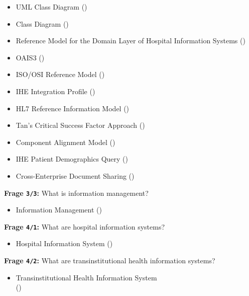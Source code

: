 \begin{itemize}
  \item UML Class Diagram ()
  \item Class Diagram ()
  \item Reference Model for the Domain Layer of Hospital Information Systems ()
  \item OAIS3 ()
  \item ISO/OSI Reference Model ()
  \item IHE Integration Profile ()
  \item HL7 Reference Information Model ()
  \item Tan’s Critical Success Factor Approach ()
  \item Component Alignment Model ()
  \item IHE Patient Demographics Query ()
  \item Cross-Enterprise Document Sharing ()
\end{itemize}

\textbf{Frage \texttt{3/3}:} What is information management?

\begin{itemize}
  \item Information Management ()
\end{itemize}

\textbf{Frage \texttt{4/1}:} What are hospital information systems?

\begin{itemize}
  \item Hospital Information System ()
\end{itemize}

\textbf{Frage \texttt{4/2}:} What are transinstitutional health information systems?

\begin{itemize}
  \item Transinstitutional Health Information System \\
  () %
\end{itemize}

